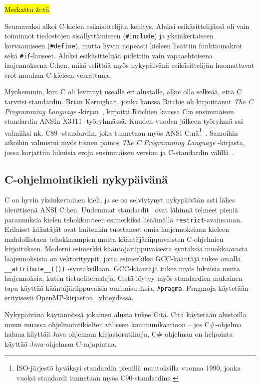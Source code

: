 \hl{Merkattu \&:tä}

Seuraavaksi alkoi C-kielen esikäsittelijän kehitys. Aluksi esikäsittelijässä
oli vain toiminnot tiedostojen sisällyttämiseen (\texttt{\#include}) ja
yksinkertaiseen korvaamiseen (\texttt{\#define}), mutta hyvin nopeasti
kieleen lisättiin funktiomakrot sekä \texttt{\#if}-lauseet. Aluksi
esikäsittelijää pidettiin vain vapaaehtoisena laajennoksena C:hen, mikä
selittää myös nykypäivänä esikäsittelijän huomattavat erot muuhun C-kieleen
verrattuna.

Myöhemmin, kun C oli levinnyt usealle eri alustalle, alkoi olla selkeää, että C
tarvitsi standardin. Brian Kernighan, jonka kanssa Ritchie oli kirjoittanut
\emph{The C Programming Language} -kirjan~\citep{krfirst}, kirjoitti Ritchien
kanssa C:n ensimmäisen standardin ANSIn X3J11 -työryhmässä. Kuuden vuoden
jälkeen työryhmä sai valmiiksi nk. C89 -standardin, joka tunnetaan myös ANSI
C:nä\footnote{ISO-järjestö hyväksyi standardin pienillä muutoksilla vuonna
1990, jonka vuoksi standardi tunnetaan myös C90-standardina.}~\citep{C89}.
Samoihin aikoihin valmistui myös toinen painos \emph{The C Programming
Language} -kirjasta, jossa korjattiin lukuisia eroja ensimmäisen version ja
C-standardin välillä~\citep{krsecond}.

\subsection{C-ohjelmointikieli nykypäivänä}

C on hyvin yksinkertainen kieli, ja se on selviytynyt nykypäivään asti lähes
identtisenä ANSI C:hen. Uudemmat standardit~\citep{C99, C11, C18} ovat lähinnä
tehneet pieniä parannuksia kielen tehokkuuteen esimerkiksi lisäämällä
\texttt{restrict}-avainsanan. Erilaiset kääntäjät ovat kuitenkin tuottaneet
omia laajennoksiaan kieleen mahdollistaen tehokkaampien mutta
kääntäjäriippuvaisten C-ohjelmien kirjoituksen. Moderni esimerkki
kääntäjäriippuvaisesta syntaksia muokkaavasta laajennoksista on vektorityypit,
joita esimerkiksi GCC-kääntäjä tukee omalla \texttt{\_\_attribute\_\_(())}
-syntaksillaan. GCC-kääntäjä tukee myös lukuisia muita laajennoksia, kuten
tietueliteraaleja. C:stä löytyy myös standardien mukainen tapa käyttää
kääntäjäriippuvaisia ominaisuuksia, \texttt{\#pragma}. Pragmoja käytetään
erityisesti OpenMP-kirjaston~\citep{openmp} yhteydessä.

Nykypäivänä käytännössä jokainen alusta tukee C:tä. C:tä käytetään alustoilla
muun muassa ohjelmointikielten väliseen kommunikaatioon -- jos C\#-ohjelma
haluaa käyttää Java-ohjelman kirjastorutiineja, C\#-ohjelman on helpointa
käyttää Java-ohjelman C-rajapintaa.

